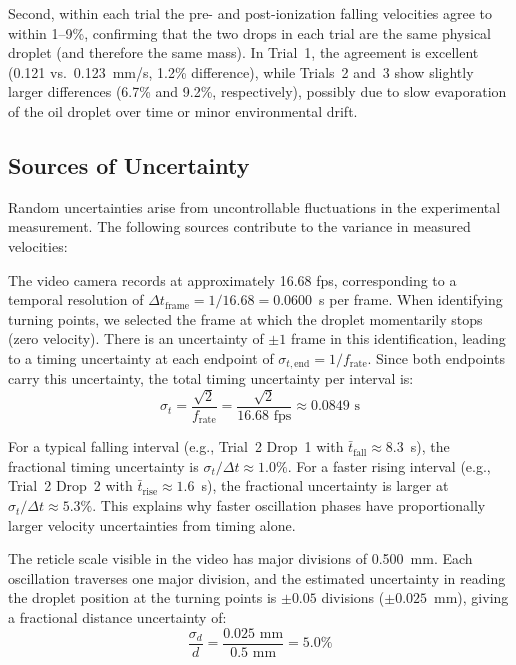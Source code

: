 \documentclass[11pt]{article}
\begin{document}
Second, within each trial the pre- and post-ionization falling velocities agree to within 1--9\%, confirming that the two drops in each trial are the same physical droplet (and therefore the same mass). In Trial~1, the agreement is excellent (0.121 vs.\ 0.123~mm/s, 1.2\% difference), while Trials~2 and~3 show slightly larger differences (6.7\% and 9.2\%, respectively), possibly due to slow evaporation of the oil droplet over time or minor environmental drift.

\subsection{Sources of Uncertainty}

Random uncertainties arise from uncontrollable fluctuations in the experimental measurement. The following sources contribute to the variance in measured velocities:

The video camera records at approximately 16.68 fps, corresponding to a temporal resolution of $\Delta t_{\text{frame}} = 1/16.68 = 0.0600$~s per frame. When identifying turning points, we selected the frame at which the droplet momentarily stops (zero velocity). There is an uncertainty of $\pm 1$ frame in this identification, leading to a timing uncertainty at each endpoint of $\sigma_{t,\text{end}} = 1/f_{\text{rate}}$. Since both endpoints carry this uncertainty, the total timing uncertainty per interval is:
\begin{equation}
\sigma_t = \frac{\sqrt{2}}{f_{\text{rate}}} = \frac{\sqrt{2}}{16.68 \text{ fps}} \approx 0.0849 \text{ s}
\end{equation}

For a typical falling interval (e.g., Trial~2 Drop~1 with $\bar{t}_{\text{fall}} \approx 8.3$~s), the fractional timing uncertainty is $\sigma_t / \Delta t \approx 1.0\%$. For a faster rising interval (e.g., Trial~2 Drop~2 with $\bar{t}_{\text{rise}} \approx 1.6$~s), the fractional uncertainty is larger at $\sigma_t / \Delta t \approx 5.3\%$. This explains why faster oscillation phases have proportionally larger velocity uncertainties from timing alone.

The reticle scale visible in the video has major divisions of 0.500~mm. Each oscillation traverses one major division, and the estimated uncertainty in reading the droplet position at the turning points is $\pm 0.05$ divisions ($\pm 0.025$~mm), giving a fractional distance uncertainty of:
\begin{equation}
\frac{\sigma_d}{d} = \frac{0.025 \text{ mm}}{0.5 \text{ mm}} = 5.0\%
\end{equation}
\end{document}
